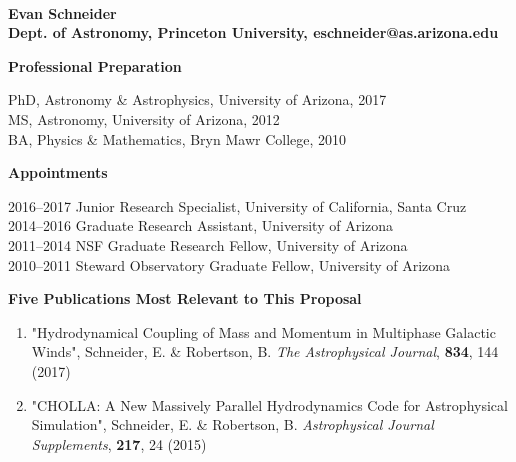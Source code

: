 \documentclass[11pt,letterpaper,english]{article}
\begin{document}
\setlength{\parindent}{0in} %

\pagestyle{fancy}   \renewcommand{%
\headrulewidth}{0.0pt}



\\
{\bf Evan Schneider}\\
{\bf Dept. of Astronomy, Princeton University, eschneider@as.arizona.edu} \smallskip

\begin{flushleft} {\bf Professional Preparation}
{\parindent 16pt

PhD, Astronomy \& Astrophysics, University of Arizona, 2017 \\ 
MS, Astronomy, University of Arizona, 2012 \\ 
BA, Physics \& Mathematics, Bryn Mawr College, 2010 \\ 
}

\vspace{.04in}
{\bf Appointments}
{\parindent 16pt

2016--2017 Junior Research Specialist, University of California, Santa Cruz \\ 
2014--2016 Graduate Research Assistant, University of Arizona \\ 
2011--2014 NSF Graduate Research Fellow, University of Arizona \\ 
2010--2011 Steward Observatory Graduate Fellow, University of Arizona \\ 
}

\vspace{.04in}
{\bf Five Publications Most Relevant to This Proposal}
\vspace{-6pt}
\begin{enumerate} \itemsep1pt \parskip0pt 
\item "Hydrodynamical Coupling of Mass and Momentum in Multiphase Galactic Winds", Schneider, E. \& Robertson, B. \textit{The Astrophysical Journal}, {\bf 834}, 144 (2017)\\ 
\item "CHOLLA: A New Massively Parallel Hydrodynamics Code for Astrophysical Simulation", Schneider, E. \& Robertson, B. \textit{Astrophysical Journal Supplements}, {\bf 217}, 24 (2015)\\ 
\end{enumerate} 


\end{flushleft}
\end{document}
